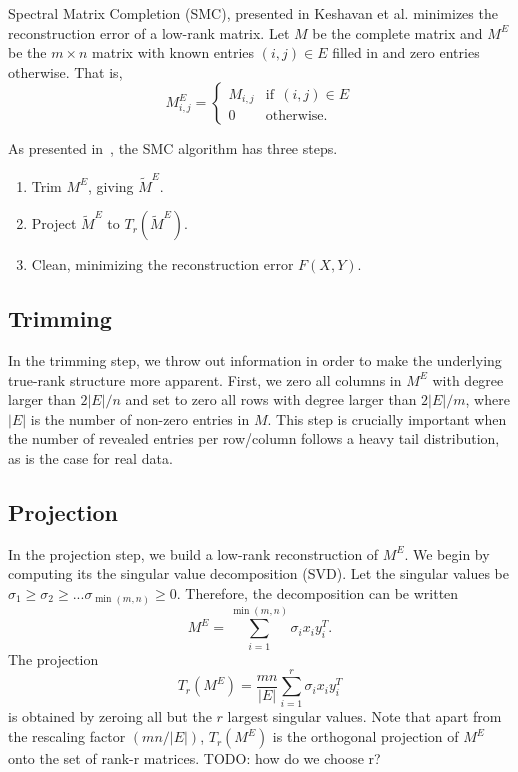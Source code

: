 Spectral Matrix Completion (SMC), presented in Keshavan et al.
\cite{keshavan2010matrix} minimizes the reconstruction error of a
low-rank matrix. Let $M$ be the complete matrix and $M^E$ be the
$m \times n$ matrix with known entries $(i,j) \in E$ filled in and
zero entries otherwise. That is,
\begin{equation}
M^E_{i,j} = \begin{cases}
    M_{i,j} & \text{if} \ \  (i,j) \in E \\
    0      & \text{otherwise}.
   \end{cases}
\end{equation}

As presented in~\cite{keshavan2010matrix}, the SMC algorithm has three
steps.
\begin{enumerate}
\item Trim $M^E$, giving $\widetilde{M}^E$.
\item Project $\widetilde{M}^E$ to $T_r(\widetilde{M}^E)$.
\item Clean, minimizing the reconstruction error $F(X,Y)$.
\end{enumerate}

\subsection{Trimming}
In the trimming step, we throw out information in order to make the
underlying true-rank structure more apparent. First, we zero all
columns in $M^E$ with degree larger than $2|E|/n$ and set to zero all
rows with degree larger than $2|E|/m$, where $|E|$ is the number of
non-zero entries in $M$. This step is crucially important when the
number of revealed entries per row/column follows a heavy tail
distribution, as is the case for real data.

\subsection{Projection}
In the projection step, we build a low-rank reconstruction of $M^E$.
We begin by computing its the singular value decomposition (SVD). Let
the singular values be
$\sigma_1 \ge \sigma_2 \ge ... \sigma_{\min(m,n)} \ge 0$. Therefore,
the decomposition can be written
\begin{equation}
  M^E = \sum_{i=1}^{\min(m,n)} \sigma_ix_iy_i^T.
\end{equation}
The projection
\begin{equation}
  T_r(M^E) = \frac{mn}{|E|}\sum\limits_{i=1}^r \sigma_ix_iy_i^T
\end{equation}
is obtained by zeroing all but the $r$ largest singular values. Note
that apart from the rescaling factor $(mn/|E|)$, $T_r(M^E)$ is the
orthogonal projection of $M^E$ onto the set of rank-r matrices. TODO:
how do we choose r?

